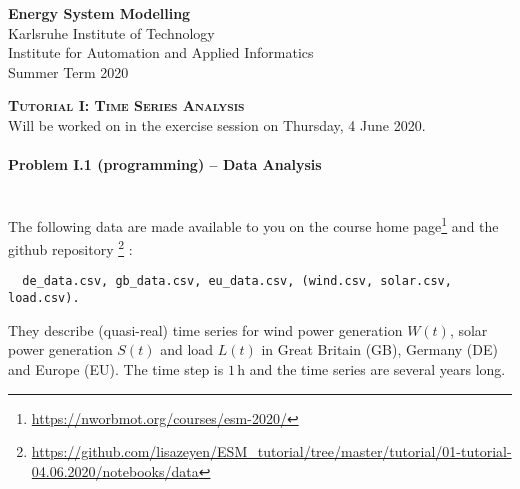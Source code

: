 \documentclass[11pt,a4paper,fleqn]{scrartcl}
\newcommand{\e}[1]{\ensuremath{\,\mathrm{#1}}}
\begin{document}
\begin{flushright}
 \textbf{Energy System Modelling }\\
 {\small Karlsruhe Institute of Technology}\\
 {\small Institute for Automation and Applied Informatics}\\
 {\small Summer Term 2020}\\
\end{flushright}

 
 \vspace{-0.5em}
 \hrulefill
 \vspace{0.3em}

\begin{center}
 \textbf{\textsc{\Large Tutorial I: Time Series Analysis}}\\
 \small Will be worked on in the exercise session on Thursday, 4 June 2020.\\[1.5em]
\end{center}

\vspace{-0.8em}
\hrulefill
\vspace{0.8em}

\paragraph{Problem I.1 (programming) -- Data Analysis \faGroup}~\\

The following data are made available to you on the course home
page\footnote{\url{https://nworbmot.org/courses/esm-2020/}} and the github repository \footnote{\url{https://github.com/lisazeyen/ESM_tutorial/tree/master/tutorial/01-tutorial-04.06.2020/notebooks/data}} :
\begin{verbatim}
  de_data.csv, gb_data.csv, eu_data.csv, (wind.csv, solar.csv, load.csv).
\end{verbatim}
They describe (quasi-real) time series for wind power generation \(W(t)\), solar power generation \(S(t)\) and load \(L(t)\) in Great Britain (GB), Germany (DE) and Europe (EU). The time step is \(1\e{h}\) and the time series are several years long.
\end{document}
